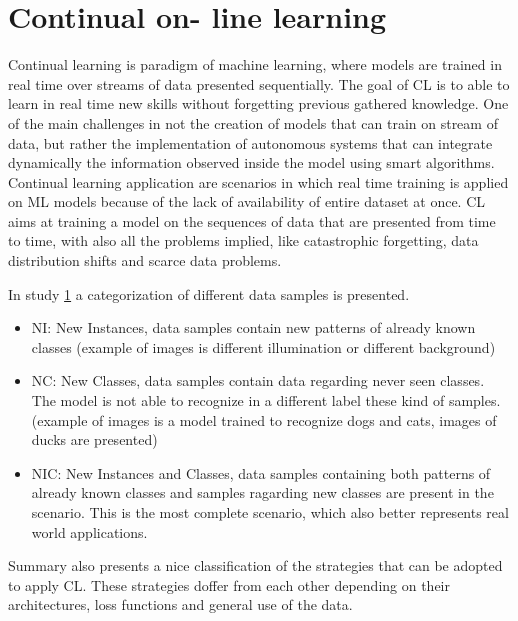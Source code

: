 \documentclass[12pt]{report}
\begin{document}
\section{Continual on- line learning}

Continual learning is paradigm of machine learning, where models are trained in real time over streams of data presented sequentially. The goal of CL is to able to learn in real time new skills without forgetting previous gathered knowledge. One of the main challenges in not the creation of models that can train on stream of data, but rather the implementation of autonomous systems that can integrate dynamically the information observed inside the model using smart algorithms. \\
Continual learning application are scenarios in which real time training is applied on ML models because of the lack of availability of entire dataset at once. CL aims at training a model on the sequences of data that are presented from time to time, with also all the problems implied, like catastrophic forgetting, data distribution shifts and scarce data problems. 




In study \ref{} a categorization of different data samples is presented.

\begin{itemize}
\item NI: New Instances, data samples contain new patterns of already known classes (example of images is different illumination or different background)
\item NC: New Classes, data samples contain data regarding never seen classes. The model is not able to recognize in a different label these kind of samples. (example of images is a model trained to recognize dogs and cats, images of ducks are presented)
\item NIC: New Instances and Classes, data samples containing both patterns of already known classes and samples ragarding new classes are present in the scenario. This is the most complete scenario, which also better represents real world applications.
\end{itemize}

Summary \autocite{} also presents a nice classification of the strategies that can be adopted to apply CL. These strategies doffer from each other depending on their architectures, loss functions and general use of the data. 
\end{document}
